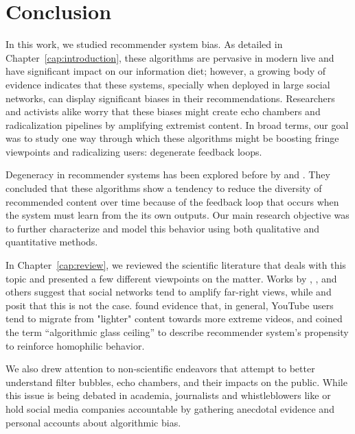 
\chapter{Conclusion}
\label{cap:conclusion}

In this work, we studied recommender system bias. As detailed in
Chapter~\ref{cap:introduction}, these algorithms are pervasive in modern live
and have significant impact on our information diet; however, a growing body of
evidence indicates that these systems, specially when deployed in large social
networks, can display significant biases in their recommendations. Researchers
and activists alike worry that these biases might create echo chambers and
radicalization pipelines by amplifying extremist content. In broad terms, our
goal was to study one way through which these algorithms might be boosting
fringe viewpoints and radicalizing users: degenerate feedback loops.

Degeneracy in recommender systems has been explored before by
\citet{nguyen_exploring_2014} and \citet{jiang_degenerate_2019}. They concluded
that these algorithms show a tendency to reduce the diversity of recommended
content over time because of the feedback loop that occurs when the system must
learn from the its own outputs. Our main research objective was to further
characterize and model this behavior using both qualitative and quantitative
methods.

In Chapter~\ref{cap:review}, we reviewed the scientific literature that deals
with this topic and presented a few different viewpoints on the matter. Works by
\citet{hosseinmardi_evaluating_2020}, \citet{huszar_algorithmic_2021}, and
others suggest that social networks tend to amplify far-right views, while
\citet{munger_right-wing_2020} and \citet{ledwich_algorithmic_2019} posit that
this is not the case. \citet{ribeiro_auditing_2020} found evidence that, in
general, YouTube users tend to migrate from "lighter" content towards more
extreme videos, and \citet{stoica_algorithmic_2018} coined the term
``algorithmic glass ceiling'' to describe recommender system's propensity to
reinforce homophilic behavior.

We also drew attention to non-scientific endeavors that attempt to better
understand filter bubbles, echo chambers, and their impacts on the public. While
this issue is being debated in academia, journalists and whistleblowers like
\citet{ribeiro_como_2021} or \citet{wong_how_2021} hold social media companies
accountable by gathering anecdotal evidence and personal accounts about
algorithmic bias.

